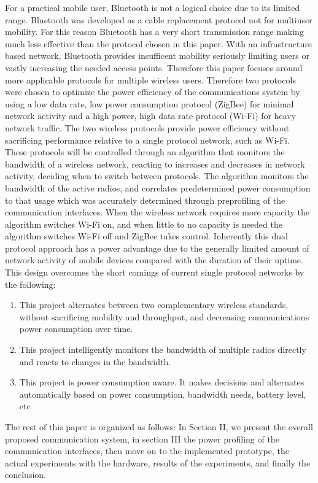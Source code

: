 \documentclass[conference]{IEEEtran}
\begin{document}
For a practical mobile user, Bluetooth is not a logical choice due to its limited range.  Bluetooth was developed as a cable replacement protocol not for multiuser mobility.  For this reason Bluetooth has a very short transmission range making much less effective than the protocol chosen in this paper\cite{thirteen}.  With an infrastructure based network, Bluetooth provides insufficent  mobility seriously limiting users or vastly increasing the needed access points.  Therefore this paper focuses around more applicable protocols for multiple wireless users.  Therefore two protocols were chosen to optimize the power efficiency of the communications system by using a low data rate, low power consumption protocol (ZigBee) for minimal network activity and a high power, high data rate protocol (Wi-Fi) for heavy network traffic. The two wireless protocols provide power efficiency without sacrificing performance relative to a single protocol network, such as Wi-Fi. These protocols will be controlled through an algorithm that monitors the bandwidth of a wireless network, reacting to increases and decreases in network activity, deciding when to switch between protocols. The algorithm monitors the bandwidth of the active radios, and correlates predetermined power consumption to that usage which was accurately determined through preprofiling of the communication interfaces. When the wireless network requires more capacity the algorithm switches Wi-Fi on, and when little to no capacity is needed the algorithm switches Wi-Fi off and ZigBee takes control.  Inherently this dual protocol approach has a power advantage due to the generally limited amount of network activity of mobile devices compared with the duration of their uptime.
This design overcomes the short comings of current single protocol networks by the following:
\begin{enumerate} 
  \item  This project alternates between two complementary wireless standards, without sacrificing mobility and throughput, and decreasing communications power consumption over time. 
  \item  This project intelligently monitors the bandwidth of multiple radios directly and reacts to changes in the bandwidth. 
  \item  This project is power consumption aware. It makes decisions and alternates automatically based on power consumption, bandwidth needs, battery level, etc 
\end{enumerate}

The rest of this paper is organized as follows: In Section II, we present the overall proposed communication system, in section III the power profiling of the communication interfaces, then move on to the implemented prototype, the actual experiments with the hardware, results of the experiments, and finally the conclusion.
\end{document}
